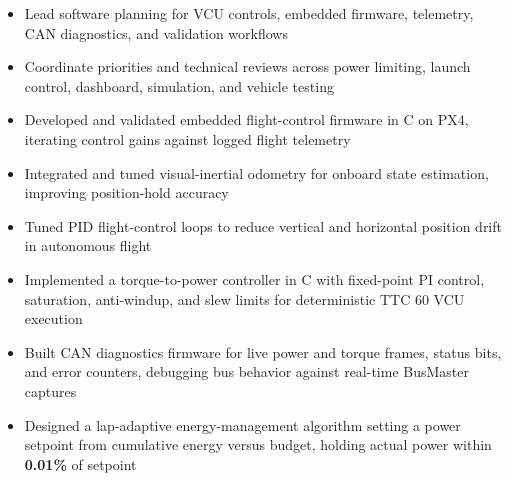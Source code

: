 \documentclass[10pt,letterpaper]{article}
\begin{document}
\bodyfont

\resumeheader
\educationsection




\orgline{\spartanracing}
\begin{itemize}
  \item Lead software planning for VCU controls, embedded firmware, telemetry, CAN diagnostics, and validation workflows
  \item Coordinate priorities and technical reviews across power limiting, launch control, dashboard, simulation, and vehicle testing
\end{itemize}

\entryspace

\begin{itemize}
  \item Developed and validated embedded flight-control firmware in C on PX4, iterating control gains against logged flight telemetry
  \item Integrated and tuned visual-inertial odometry for onboard state estimation, improving position-hold accuracy
  \item Tuned PID flight-control loops to reduce vertical and horizontal position drift in autonomous flight
\end{itemize}

\entryspace

\orgline{\spartanracing}
\begin{itemize}
  \item Implemented a torque-to-power controller in C with fixed-point PI control, saturation, anti-windup, and slew limits for deterministic TTC 60 VCU execution
  \item Built CAN diagnostics firmware for live power and torque frames, status bits, and error counters, debugging bus behavior against real-time BusMaster captures
  \item Designed a lap-adaptive energy-management algorithm setting a power setpoint from cumulative energy versus budget, holding actual power within \textbf{0.01\%} of setpoint
\end{itemize}
\end{document}
